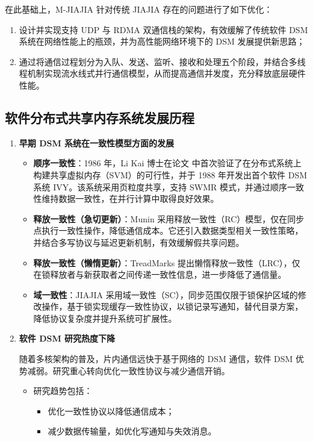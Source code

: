 {  在此基础上，M-JIAJIA 针对传统 JIAJIA 存在的问题进行了如下优化：
  \begin{enumerate}
    \item 设计并实现支持 UDP 与 RDMA 双通信栈的架构，有效缓解了传统软件 DSM 系统在网络性能上的瓶颈，并为高性能网络环境下的 DSM 发展提供新思路；
    \item 通过将通信过程划分为入队、发送、监听、接收和处理五个阶段，并结合多线程机制实现流水线式并行通信模型，从而提高通信并发度，充分释放底层硬件性能。
  \end{enumerate}

  \subsection{软件分布式共享内存系统发展历程}
  \begin{enumerate}[leftmargin=1em, align=left]
    \item \textbf{早期 DSM 系统在一致性模型方面的发展}
          \begin{itemize}
            \item \textbf{顺序一致性}：1986 年，Li Kai 博士在论文\citep{likai1986svm} 中首次验证了在分布式系统上构建共享虚拟内存（SVM）的可行性，并于 1988 年开发出首个软件 DSM 系统 IVY\citep{likai1988ivy}。该系统采用页粒度共享，支持 SWMR 模式，并通过顺序一致性维持数据一致性，在并行计算中取得良好效果。
            \item \textbf{释放一致性（急切更新）}：Munin\citep{bennett1990munin} 采用释放一致性（RC）模型，仅在同步点执行一致性操作，降低通信成本。它还引入数据类型相关一致性策略，并结合多写协议与延迟更新机制，有效缓解假共享问题。
            \item \textbf{释放一致性（懒惰更新）}：TreadMarks\citep{amza1996treadmarks} 提出懒惰释放一致性（LRC），仅在锁释放者与新获取者之间传递一致性信息，进一步降低了通信量。
            \item \textbf{域一致性}：JIAJIA 采用域一致性（SC），同步范围仅限于锁保护区域的修改操作，基于锁实现缓存一致性协议，以锁记录写通知，替代目录方案，降低协议复杂度并提升系统可扩展性。
          \end{itemize}

    \item \textbf{软件 DSM 研究热度下降}

          随着多核架构的普及，片内通信远快于基于网络的 DSM 通信，软件 DSM 优势减弱。研究重心转向优化一致性协议与减少通信开销\citep{Cheung1999AMP, abe2003movinghomedsm}。
          \begin{itemize}
            \item 研究趋势包括：
                  \begin{itemize}
                    \item 优化一致性协议以降低通信成本；
                    \item 减少数据传输量，如优化写通知与失效消息。
                  \end{itemize}
          \end{itemize}


\end{enumerate}}
